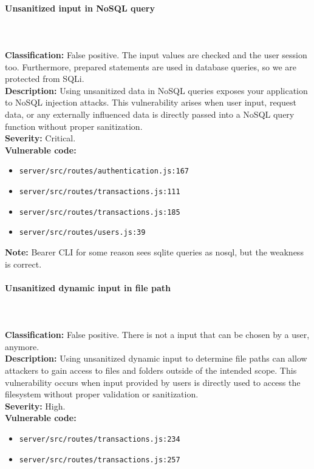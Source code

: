 \documentclass[]{article}
\begin{document}
\paragraph{Unsanitized input in NoSQL query} \mbox{} \\ \\
\textbf{Classification:} False positive. The input values are checked and the user session too. Furthermore, prepared statements are used in database queries, so we are protected from SQLi.\\
\textbf{Description:} Using unsanitized data in NoSQL queries exposes your application to NoSQL injection attacks. This vulnerability arises when user input, request data, or any externally influenced data is directly passed into a NoSQL query function without proper sanitization. \\
\textbf{Severity:} Critical. \\ 
\textbf{Vulnerable code:}
\begin{itemize}
    \item \texttt{server/src/routes/authentication.js:167}
    \item \texttt{server/src/routes/transactions.js:111}
    \item \texttt{server/src/routes/transactions.js:185}
    \item \texttt{server/src/routes/users.js:39}
\end{itemize}
\textbf{Note:} Bearer CLI for some reason sees sqlite queries as nosql, but the weakness is correct.

\paragraph{Unsanitized dynamic input in file path} \mbox{} \\ \\
\textbf{Classification:} False positive. There is not a input that can be chosen by a user, anymore. \\
\textbf{Description:} Using unsanitized dynamic input to determine file paths can allow attackers to gain access to files and folders outside of the intended scope. This vulnerability occurs when input provided by users is directly used to access the filesystem without proper validation or sanitization. \\ 
\textbf{Severity:} High. \\ 
\textbf{Vulnerable code:}
\begin{itemize}
    \item \texttt{server/src/routes/transactions.js:234}
    \item \texttt{server/src/routes/transactions.js:257}
\end{itemize}
\end{document}
